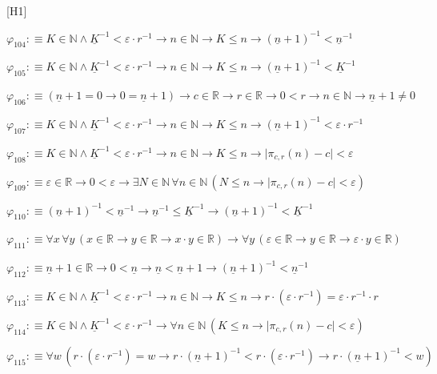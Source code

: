 \begin{fullproof}{[H1]}
\begin{abbrevlist}
\item $\varphi_{104} :\equiv K \in \mathbb{N} \land \underline{K}^{-1} < \varepsilon \cdot r^{-1} \to n \in \mathbb{N} \to K \leq n \to (\underline{n} + 1)^{-1} < \underline{n}^{-1}$
\item $\varphi_{105} :\equiv K \in \mathbb{N} \land \underline{K}^{-1} < \varepsilon \cdot r^{-1} \to n \in \mathbb{N} \to K \leq n \to (\underline{n} + 1)^{-1} < \underline{K}^{-1}$
\item $\varphi_{106} :\equiv (\underline{n} + 1 = 0 \to 0 = \underline{n} + 1) \to c \in \mathbb{R} \to r \in \mathbb{R} \to 0 < r \to n \in \mathbb{N} \to \underline{n} + 1 \neq 0$
\item $\varphi_{107} :\equiv K \in \mathbb{N} \land \underline{K}^{-1} < \varepsilon \cdot r^{-1} \to n \in \mathbb{N} \to K \leq n \to (\underline{n} + 1)^{-1} < \varepsilon \cdot r^{-1}$
\item $\varphi_{108} :\equiv K \in \mathbb{N} \land \underline{K}^{-1} < \varepsilon \cdot r^{-1} \to n \in \mathbb{N} \to K \leq n \to \lvert \pi_{c,r}(n) - c \rvert < \varepsilon$
\item $\varphi_{109} :\equiv \varepsilon \in \mathbb{R} \to 0 < \varepsilon \to \exists N \in \mathbb{N}\,\forall n \in \mathbb{N}\,(N \leq n \to \lvert \pi_{c,r}(n) - c \rvert < \varepsilon)$
\item $\varphi_{110} :\equiv (\underline{n} + 1)^{-1} < \underline{n}^{-1} \to \underline{n}^{-1} \leq \underline{K}^{-1} \to (\underline{n} + 1)^{-1} < \underline{K}^{-1}$
\item $\varphi_{111} :\equiv \forall x\,\forall y\,(x \in \mathbb{R} \to y \in \mathbb{R} \to x \cdot y \in \mathbb{R}) \to \forall y\,(\varepsilon \in \mathbb{R} \to y \in \mathbb{R} \to \varepsilon \cdot y \in \mathbb{R})$
\item $\varphi_{112} :\equiv \underline{n} + 1 \in \mathbb{R} \to 0 < \underline{n} \to \underline{n} < \underline{n} + 1 \to (\underline{n} + 1)^{-1} < \underline{n}^{-1}$
\item $\varphi_{113} :\equiv K \in \mathbb{N} \land \underline{K}^{-1} < \varepsilon \cdot r^{-1} \to n \in \mathbb{N} \to K \leq n \to r \cdot (\varepsilon \cdot r^{-1}) = \varepsilon \cdot r^{-1} \cdot r$
\item $\varphi_{114} :\equiv K \in \mathbb{N} \land \underline{K}^{-1} < \varepsilon \cdot r^{-1} \to \forall n \in \mathbb{N}\,(K \leq n \to \lvert \pi_{c,r}(n) - c \rvert < \varepsilon)$
\item $\varphi_{115} :\equiv \forall w\,(r \cdot (\varepsilon \cdot r^{-1}) = w \to r \cdot (\underline{n} + 1)^{-1} < r \cdot (\varepsilon \cdot r^{-1}) \to r \cdot (\underline{n} + 1)^{-1} < w)$

\end{abbrevlist}
\end{fullproof}
